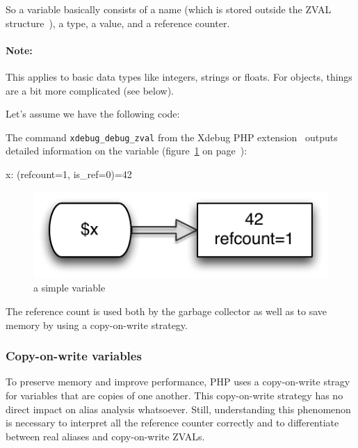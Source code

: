 So a variable basically consists of a name (which is stored outside the ZVAL structure~\cite{php-extensions-zval}), a type, a value, and a reference counter.

\paragraph{Note:} This applies to basic data types like integers, strings or floats. For objects, things are a bit more complicated (see below).

Let's assume we have the following code:


The command \texttt{xdebug\_debug\_zval} from the Xdebug PHP extension~\cite{xdebug-functions} outputs detailed information on the variable (figure~\ref{fig:simple-variable} on page~\pageref{fig:simple-variable}):

\begin{textcode}
x: (refcount=1, is_ref=0)=42
\end{textcode}

\begin{figure}[!h]
  \begin{center}
    \includegraphics[scale=0.8]{images/x_42}
    \caption{a simple variable}
    \label{fig:simple-variable}
  \end{center}
\end{figure}

The reference count is used both by the garbage collector as well as to save memory by using a copy-on-write strategy.~\cite{php-manual-reference-counting}


\subsubsection{Copy-on-write variables}
\label{sec:copy-on-write}

To preserve memory and improve performance, PHP uses a copy-on-write stragy for variables that are copies of one another. This copy-on-write strategy has no direct impact on alias analysis whatsoever. Still, understanding this phenomenon is necessary to interpret all the reference counter correctly and to differentiate between real aliases and copy-on-write ZVALs.

